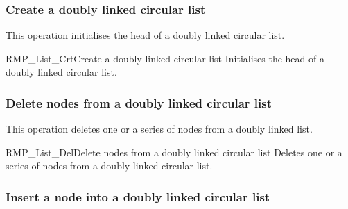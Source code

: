 \subsubsection{Create a doubly linked circular list}

This operation initialises the head of a doubly linked circular list.

\begin{apidesc}{RMP\_List\_Crt}{Create a doubly linked circular list}\label{api:RMP_List_Crt}
    Initialises the head of a doubly linked circular list.
    \begin{apiparams}
    \end{apiparams}
    \begin{apiret}
    \end{apiret}
\end{apidesc}

\subsubsection{Delete nodes from a doubly linked circular list}

This operation deletes one or a series of nodes from a doubly linked list.

\begin{apidesc}{RMP\_List\_Del}{Delete nodes from a doubly linked circular list}\label{api:RMP_List_Del}
    Deletes one or a series of nodes from a doubly linked circular list.
    \begin{apiparams}
    \end{apiparams}
    \begin{apiret}
    \end{apiret}
\end{apidesc}

\subsubsection{Insert a node into a doubly linked circular list}

